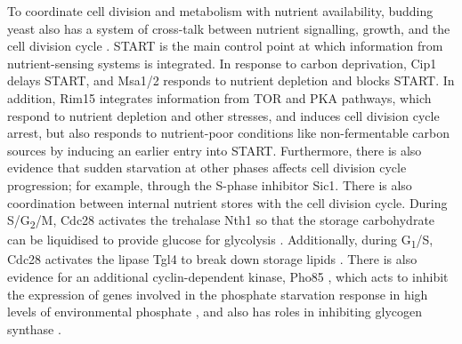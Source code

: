 To coordinate cell division and metabolism with nutrient availability, budding yeast also has a system of cross-talk between nutrient signalling, growth, and the cell division cycle \parencite{ewaldHowYeastCoordinates2018}.
START is the main control point at which information from nutrient-sensing systems is integrated.
In response to carbon deprivation, Cip1 delays START, and Msa1/2 responds to nutrient depletion and blocks START.
In addition, Rim15 integrates information from TOR and PKA pathways, which respond to nutrient depletion and other stresses, and induces cell division cycle arrest, but also responds to nutrient-poor conditions like non-fermentable carbon sources by inducing an earlier entry into START.
Furthermore, there is also evidence that sudden starvation at other phases affects cell division cycle progression; for example, through the S-phase inhibitor Sic1.
There is also coordination between internal nutrient stores with the cell division cycle.
During S/G\textsubscript{2}/M, Cdc28 activates the trehalase Nth1 so that the storage carbohydrate can be liquidised to provide glucose for glycolysis \parencite{ewaldYeastCyclinDependentKinase2016}.
Additionally, during G\textsubscript{1}/S, Cdc28 activates the lipase Tgl4 to break down storage lipids \parencite{kuratCdk1Cdc28DependentActivation2009}.
There is also evidence for an additional cyclin-dependent kinase, Pho85 \parencite{huangPho85MultifunctionalCyclindependent2007}, which acts to inhibit the expression of genes involved in the phosphate starvation response in high levels of environmental phosphate \parencite{oneillRegulationPHO4Nuclear1996}, and also has roles in inhibiting glycogen synthase \parencite{wilsonSubstrateTargetingYeast1999}.


